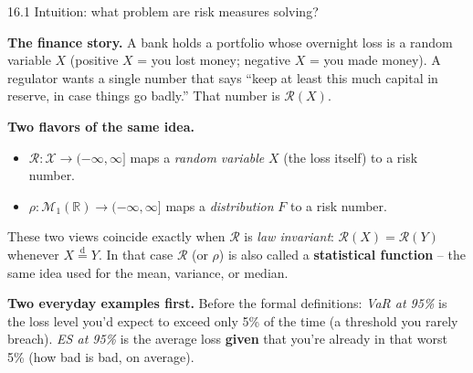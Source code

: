\documentclass[aspectratio=169,10pt]{beamer}
\newcommand{\RR}{\mathbb{R}}
\newcommand{\1}{\mathbb{1}}
\begin{document}
\begin{frame}{16.1 Intuition: what problem are risk measures solving?}

\textbf{The finance story.} A bank holds a portfolio whose overnight loss is a random variable $X$ (positive $X$ = you lost money; negative $X$ = you made money). A regulator wants a single number that says ``keep at least this much capital in reserve, in case things go badly.'' That number is $\mathcal R(X)$.

\vspace{2mm}
\textbf{Two flavors of the same idea.}
\begin{itemize}
\item $\mathcal R: \mathcal X \to (-\infty,\infty]$ maps a \emph{random variable} $X$ (the loss itself) to a risk number.
\item $\rho: \mathcal M_1(\RR) \to (-\infty,\infty]$ maps a \emph{distribution} $F$ to a risk number.
\end{itemize}
These two views coincide exactly when $\mathcal R$ is \emph{law invariant}: $\mathcal R(X)=\mathcal R(Y)$ whenever $X \stackrel{\mathrm d}{=} Y$. In that case $\mathcal R$ (or $\rho$) is also called a \textbf{statistical function} -- the same idea used for the mean, variance, or median.

\vspace{2mm}
\textbf{Two everyday examples first.} Before the formal definitions: \emph{VaR at 95\%} is the loss level you'd expect to exceed only 5\% of the time (a threshold you rarely breach). \emph{ES at 95\%} is the average loss \textbf{given} that you're already in that worst 5\% (how bad is bad, on average).

\end{frame}
\end{document}
